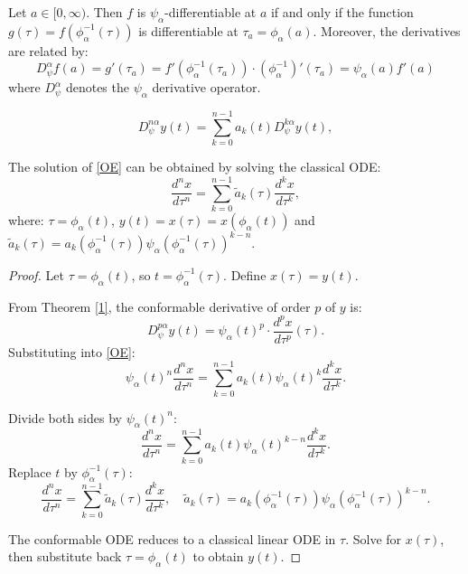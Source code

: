 \documentclass[10pt,a4paper]{amsart}
\begin{document}
\begin{theorem}\label{1} Let \( a \in [0, \infty) \). Then \( f \) is \( \psi_{\alpha} \)-differentiable at \( a \) if and only if the function \( g(\tau) = f(\phi_{\alpha}^{-1}(\tau)) \) is differentiable at \( \tau_a = \phi_{\alpha}(a) \). Moreover, the derivatives are related by:
\[
D^{\alpha}_{\psi} f(a) = g'(\tau_a) = f'(\phi_\alpha^{-1}(\tau_a)) \cdot (\phi_{\alpha}^{-1})'(\tau_a) = \psi_{\alpha}(a) f'(a)
\]
where $D^{\alpha}_{\psi}$ denotes the $\psi_\alpha$ derivative operator.
\end{theorem}

\begin{equation}\label{OE}
D_\psi^{n\alpha} y(t) = \sum_{k=0}^{n-1} a_k(t) D_\psi^{k\alpha} y(t),
\end{equation}

\begin{proposition} The solution of \eqref{OE} can be obtained by solving the classical ODE:
\[
\frac{d^n x}{d\tau^n} = \sum_{k=0}^{n-1} \widetilde{a}_k(\tau) \frac{d^k x}{d\tau^k},
\]
where: \( \tau = \phi_\alpha(t) \),  \( y(t) = x(\tau) = x\left(\phi_\alpha(t)\right) \) and \( \widetilde{a}_k(\tau) = a_k\left(\phi_\alpha^{-1}(\tau)\right) \psi_\alpha\left(\phi_\alpha^{-1}(\tau)\right)^{k-n} \).
\end{proposition}

\begin{proof}  Let \( \tau = \phi_\alpha(t) \), so \( t = \phi_\alpha^{-1}(\tau) \). Define \( x(\tau) = y(t) \).


   From Theorem \ref{1}, the conformable derivative of order \( p \) of \( y \) is:
   \[
   D_\psi^{p\alpha} y(t) = \psi_\alpha(t)^p \cdot \frac{d^p x}{d\tau^p}(\tau).
   \]
   Substituting into \eqref{OE}:
   \[
   \psi_\alpha(t)^n \frac{d^n x}{d\tau^n} = \sum_{k=0}^{n-1} a_k(t) \psi_\alpha(t)^k \frac{d^k x}{d\tau^k}.
   \]


   Divide both sides by \( \psi_\alpha(t)^n \):
   \[
   \frac{d^n x}{d\tau^n} = \sum_{k=0}^{n-1} a_k(t) \psi_\alpha(t)^{k-n} \frac{d^k x}{d\tau^k}.
   \]
   Replace \( t \) by \( \phi_\alpha^{-1}(\tau) \):
   \[
   \frac{d^n x}{d\tau^n} = \sum_{k=0}^{n-1} \widetilde{a}_k(\tau) \frac{d^k x}{d\tau^k}, \quad \widetilde{a}_k(\tau) = a_k\left(\phi_\alpha^{-1}(\tau)\right) \psi_\alpha\left(\phi_\alpha^{-1}(\tau)\right)^{k-n}.
   \]

   The conformable ODE reduces to a classical linear ODE in \( \tau \). Solve for \( x(\tau) \), then substitute back \( \tau = \phi_\alpha(t) \) to obtain \( y(t) \).
\end{proof}
\end{document}
